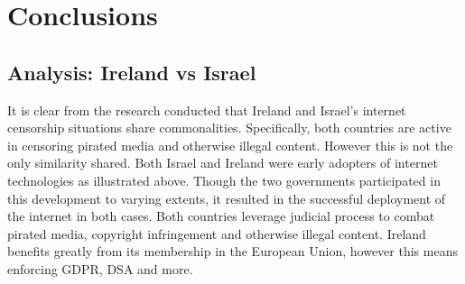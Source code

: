 \chapter{Conclusions}

\section{Analysis: Ireland vs Israel}
It is clear from the research conducted that Ireland and Israel's internet censorship situations share commonalities. Specifically, both countries are active in censoring pirated media and otherwise illegal content. However this is not the only similarity shared. Both Israel and Ireland were early adopters of internet technologies as illustrated above. Though the two governments participated in this development to varying extents, it resulted in the successful deployment of the internet in both cases. Both countries leverage judicial process to combat pirated media, copyright infringement and otherwise illegal content. Ireland benefits greatly from its membership in the European Union, however this means enforcing GDPR, DSA and more.
